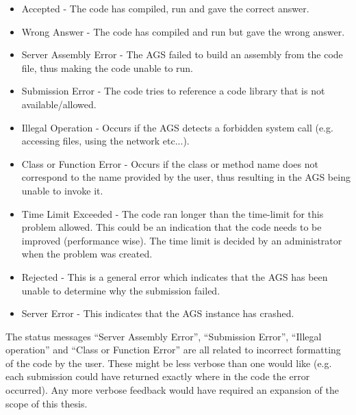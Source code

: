 \begin{itemize}
	\item Accepted - The code has compiled, run and gave the correct answer.
	\item Wrong Answer - The code has compiled and run but gave the wrong answer.
	\item Server Assembly Error - The AGS failed to build an assembly from the code file, thus making the code unable to run.
	\item Submission Error - The code tries to reference a code library that is not available/allowed.
	\item Illegal Operation - Occurs if the AGS detects a forbidden system call (e.g. accessing files, using the network etc...).
	\item Class or Function Error - Occurs if the class or method name does not correspond to the name provided by the user, thus resulting in the AGS being unable to invoke it.
	\item Time Limit Exceeded - The code ran longer than the time-limit for this problem allowed. This could be an indication that the code needs to be improved (performance wise). The time limit is decided by an administrator when the problem was created.
	\item Rejected - This is a general error which indicates that the AGS has been unable to determine why the submission failed.
	\item Server Error - This indicates that the AGS instance has crashed.
\end{itemize}

The status messages ``Server Assembly Error'', ``Submission Error'', ``Illegal operation'' and ``Class or Function Error'' are all related to incorrect formatting of the code by the user. These might be less verbose than one would like (e.g. each submission could have returned exactly where in the code the error occurred). Any more verbose feedback would have required an expansion of the scope of this thesis.

